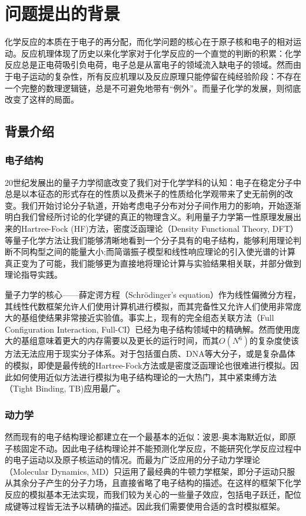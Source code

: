 \section{问题提出的背景}
化学反应的本质在于电子的再分配，而化学问题的核心在于原子核和电子的相对运动。反应机理体现了历史以来化学家对于化学反应的一个直觉的判断的积累：化学反应总是正电荷吸引负电荷，电子总是从富电子的领域流入缺电子的领域。然而由于电子运动的复杂性，所有反应机理以及反应原理只能停留在纯经验阶段：不存在一个完整的数理逻辑链，总是不可避免地带有``例外''。而量子化学的发展，则彻底改变了这样的局面。

\subsection{背景介绍}

\subsubsection{电子结构}
20世纪发展出的量子力学彻底改变了我们对于化学学科的认知：电子在稳定分子中总是以本征态的形式存在的性质以及费米子的性质给化学观带来了史无前例的改变。我们开始讨论分子轨道，开始考虑电子分布对分子间作用力的影响，开始逐渐明白我们曾经所讨论的化学键的真正的物理含义。利用量子力学第一性原理发展出来的Hartree-Fock (HF)方法，密度泛函理论（Density Functional Theory, DFT）等量子化学方法让我们能够清晰地看到一个分子具有的电子结构，能够利用理论判断不同构型之间的能量大小;而简谐振子模型和线性响应理论的引入使光谱的计算真正变为了可能，我们能够更为直接地将理论计算与实验结果相关联，并部分做到理论指导实践。

量子力学的核心——薛定谔方程（Schr\"odinger's equation）作为线性偏微分方程，其线性代数框架允许人们使用计算机进行模拟，而其完备性又允许人们使用非常庞大的基组使结果非常接近实验值。事实上，现有的完全组态关联方法（Full Configuration Interaction, Full-CI）已经为电子结构领域中的精确解。然而使用庞大的基组意味着更大的内存需要以及更长的运行时间，而其$O(N^6)$的复杂度使该方法无法应用于现实分子体系。对于包括蛋白质、DNA等大分子，或是复杂晶体的模拟，即使是最传统的Hartree-Fock方法或是密度泛函理论也很难进行模拟。因此如何使用近似方法进行模拟为电子结构理论的一大热门，其中紧束缚方法（Tight Binding, TB)应用最广。

\subsubsection{动力学}

然而现有的电子结构理论都建立在一个最基本的近似：波恩-奥本海默近似，即原子核固定不动。因此电子结构理论并不能预测化学反应，不能研究化学反应过程中的电子运动以及原子核运动的情况。而最为广泛应用的分子动力学理论（Molecular Dynamics, MD）只运用了最经典的牛顿力学框架，即分子运动只服从其余分子产生的分子力场，且直接省略了电子结构的描述。在这样的框架下化学反应的模拟基本无法实现，而我们较为关心的一些量子效应，包括电子跃迁，配位成键等过程皆无法予以精确的描述。因此我们需要使用合适的含时模拟框架。

